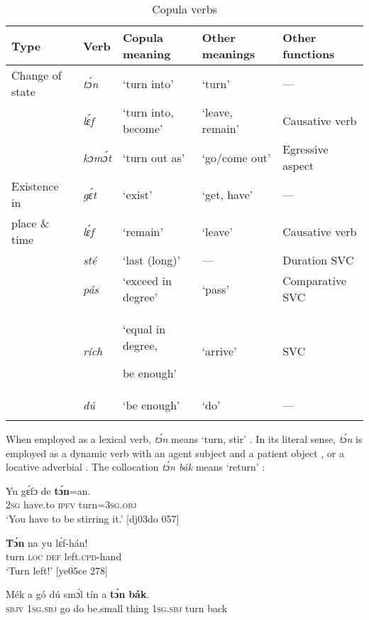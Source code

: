 \begin{table}
\caption{Copula verbs}
\label{tab:key:7.8}

\begin{tabularx}{\textwidth}{l@{~~}lQll}
\lsptoprule

Type & Verb & Copula meaning & Other meanings & Other functions\\
\midrule
Change of state & \itshape tɔ́n & ‘turn into’ & ‘turn’ & —\\
& \itshape lɛ́f & ‘turn into, become’ & ‘leave, remain’ & Causative verb\\
& \itshape kɔmɔ́t & ‘turn out as’ & ‘go/come out’ & Egressive aspect\\

\tablevspace
Existence in & \itshape gɛ́t & ‘exist’ & ‘get, have’ & —\\
place \& time & \itshape lɛ́f & ‘remain’ & ‘leave’ & Causative verb\\
& \itshape sté & ‘last (long)’ & — & Duration SVC\\
& \itshape pás & ‘exceed in degree’ & ‘pass’ & Comparative SVC\\
& \itshape rích & ‘equal in degree, 

be enough’ & ‘arrive’ & SVC\\
& \itshape dú & ‘be enough’ & ‘do’ & —\\
\lspbottomrule
\end{tabularx}
\end{table}
When employed as a lexical verb, \textit{tɔ́n} means ‘turn, stir’ . In its literal sense, \textit{tɔ́n} is employed as a dynamic verb with an agent subject and a patient object , or a locative adverbial . The collocation \textit{tɔ́n bák} means ‘return’ : 


\ea%
    \label{ex:key:795}
    \gll Yu  gɛ́fɔ    de  \textbf{tɔ́n}=an.\\
\textsc{2sg}  have.to  \textsc{ipfv}  turn=\textsc{3sg.obj}\\

\glt ‘You have to be stirring it.’ [dj03do 057]
\z


\ea%
    \label{ex:key:796}
    \gll \textbf{Tɔ́n}  na  yu  lɛ́f-hán!\\
turn  \textsc{loc}  \textsc{def}  left.\textsc{cpd}{}-hand\\

\glt ‘Turn left!’ [ye05ce 278]
\z


\ea%
    \label{ex:key:797}
    \gll Mék    a    gó  dú  smɔ́l  tín    a    \textbf{tɔ́n}    \textbf{bák}.\\
\textsc{sbjv}    \textsc{1sg.sbj}  go  do  be.small  thing  \textsc{1sg.sbj}  turn    back\\

